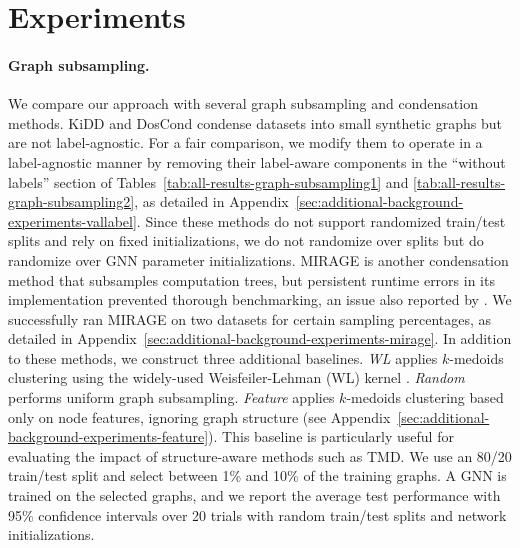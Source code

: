 
\section{Experiments}\label{sec:experiments}

\paragraph{Graph subsampling.} We compare our approach with several graph subsampling and condensation methods. KiDD \citep{kidd} and DosCond \citep{jin2022condensing} condense datasets into small synthetic graphs but are not label-agnostic. For a fair comparison, we modify them to operate in a label-agnostic manner by removing their label-aware components in the ``without labels'' section of Tables~\ref{tab:all-results-graph-subsampling1} and \ref{tab:all-results-graph-subsampling2}, as detailed in Appendix~\ref{sec:additional-background-experiments-vallabel}. Since these methods do not support randomized train/test splits and rely on fixed initializations, we do not randomize over splits but do randomize over GNN parameter initializations. MIRAGE \citep{mirage} is another condensation method that subsamples computation trees, but persistent runtime errors in its implementation prevented thorough benchmarking, an issue also reported by \citet{sun2024gc}. We successfully ran MIRAGE on two datasets for certain sampling percentages, as detailed in Appendix~\ref{sec:additional-background-experiments-mirage}.  In addition to these methods, we construct three additional baselines. \emph{WL} applies $k$-medoids clustering using the widely-used Weisfeiler-Lehman (WL) kernel \citep{shervashidze2011weisfeiler}. \emph{Random} performs uniform graph subsampling. \emph{Feature} applies $k$-medoids clustering based only on node features, ignoring graph structure (see Appendix~\ref{sec:additional-background-experiments-feature}). This baseline is particularly useful for evaluating the impact of structure-aware methods such as TMD.  We use an 80/20 train/test split and select between 1\% and 10\% of the training graphs. A GNN is trained on the selected graphs, and we report the average test performance with 95\% confidence intervals over 20 trials with random train/test splits and network initializations.  

